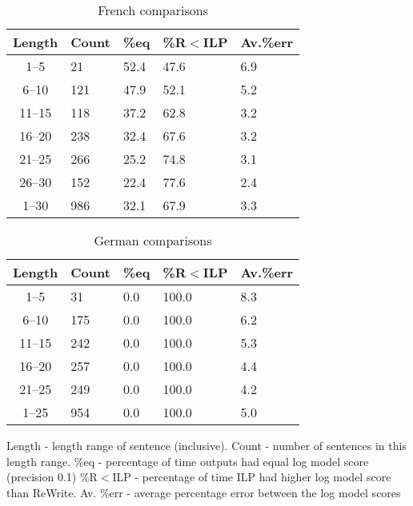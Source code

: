 \begin{table}[tp]
  \centering
  \begin{tabular}{|c|l|l|l|l|}
    \hline
    Length & Count & \%eq & \%R$<$ILP & Av.\%err \\
    \hline
    1--5 & 21 & 52.4 & 47.6 & 6.9 \\
    6--10 & 121 & 47.9 & 52.1 & 5.2 \\
    11--15 & 118 & 37.2 & 62.8 & 3.2 \\
    16--20 & 238 & 32.4 & 67.6 & 3.2 \\
    21--25 & 266 & 25.2 & 74.8 & 3.1 \\
    26--30 & 152 & 22.4 & 77.6 & 2.4 \\
    \hline 
    1--30 & 986 & 32.1 & 67.9 & 3.3 \\
    \hline
  \end{tabular}
  \caption{French comparisons}
  \label{tab:french-compare}
\end{table}

\begin{table}[tp]
  \centering
  \begin{tabular}{|c|l|l|l|l|}
    \hline
    Length & Count & \%eq & \%R$<$ILP & Av.\%err \\
    \hline
    1--5 & 31 & 0.0 & 100.0 & 8.3 \\
    6--10 & 175 & 0.0 & 100.0 & 6.2 \\
    11--15 & 242 & 0.0 & 100.0 & 5.3 \\
    16--20 & 257 & 0.0 & 100.0 & 4.4 \\
    21--25 & 249 & 0.0 & 100.0 & 4.2 \\
    \hline 
    1--25 & 954 & 0.0 & 100.0 & 5.0 \\
    \hline
  \end{tabular}
  \caption{German comparisons}
  \label{tab:german-compare}
\end{table}

Length - length range of sentence (inclusive).
Count - number of sentences in this length range.
\%eq - percentage of time outputs had equal log model score (precision 0.1)
\%R$<$ILP - percentage of time ILP had higher log model score than ReWrite.
Av. \%err - average percentage error between the log model scores

